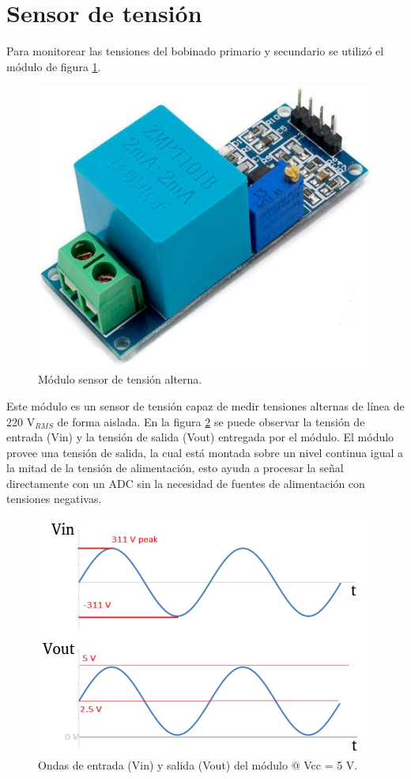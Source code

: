 \section{Sensor de tensión}
\label{sec:secZMPT101B}

Para monitorear las tensiones del bobinado primario y secundario se utilizó el módulo de figura \ref{fig:ZMPT101B}.

\begin{figure}[htpb]
	\centering
	\includegraphics[scale=.3]{./Figures/zmpt101b.jpg}
	\caption{Módulo sensor de tensión alterna.}
	\label{fig:ZMPT101B}
\end{figure}

Este módulo es un sensor de tensión capaz de medir tensiones alternas de línea de 220 V$_{RMS}$ de forma aislada. En la figura \ref{fig:ZMPT101B_waves} se puede observar la tensión de entrada (Vin) y la tensión de salida (Vout) entregada por el módulo. El módulo provee una tensión de salida, la cual está montada sobre un nivel continua igual a la mitad de la tensión de alimentación, esto ayuda a procesar la señal directamente con un ADC sin la necesidad de fuentes de alimentación con tensiones negativas.

\begin{figure}[htpb]
	\centering
	\includegraphics[scale=1.1]{./Figures/ZMPT101B_waves.png}
	\caption{Ondas de entrada (Vin) y salida (Vout) del módulo @ Vcc = 5 V.}
	\label{fig:ZMPT101B_waves}
\end{figure}

